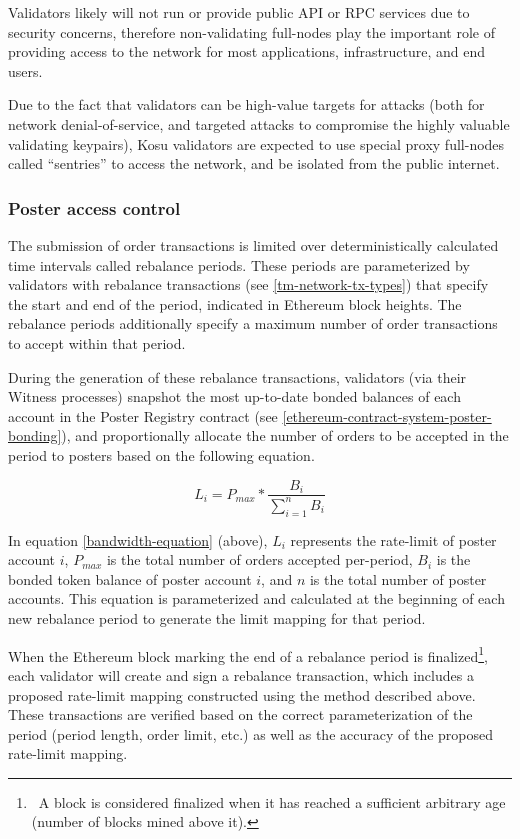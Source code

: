 \documentclass[10pt]{article}
\begin{document}
Validators likely will not run or provide public API or RPC services due to security concerns, therefore non-validating full-nodes play the important role of providing access to the network for most applications, infrastructure, and end users.
\medskip

Due to the fact that validators can be high-value targets for attacks (both for network denial-of-service, and targeted attacks to compromise the highly valuable validating keypairs), Kosu validators are expected to use special proxy full-nodes called ``sentries'' to access the network, and be isolated from the public internet\cite{sentry-architecture}.
\subsubsection{Poster access control}\label{tm-network-access}
The submission of order transactions is limited over deterministically calculated time intervals called rebalance periods. These periods are parameterized by validators with rebalance transactions (see \ref{tm-network-tx-types}) that specify the start and end of the period, indicated in Ethereum block heights. The rebalance periods additionally specify a maximum number of order transactions to accept within that period. 
\medskip

During the generation of these rebalance transactions, validators (via their Witness processes) snapshot the most up-to-date bonded balances of each account in the Poster Registry contract (see \ref{ethereum-contract-system-poster-bonding}), and proportionally allocate the number of orders to be accepted in the period to posters based on the following equation.

\begin{equation}\label{bandwidth-equation}
  L_i =  P_{max} * \frac{B_i}{\sum_{i=1}^{n}B_i}
\end{equation}
\medskip

In equation \ref{bandwidth-equation} (above), $L_i$ represents the rate-limit of poster account $i$, $P_{max}$ is the total number of orders accepted per-period, $B_i$ is the bonded token balance of poster account $i$, and $n$ is the total number of poster accounts. This equation is parameterized and calculated at the beginning of each new rebalance period to generate the limit mapping for that period.
\medskip 

When the Ethereum block marking the end of a rebalance period is finalized\footnote{\ A block is considered finalized when it has reached a sufficient arbitrary age (number of blocks mined above it).}, each validator will create and sign a rebalance transaction, which includes a proposed rate-limit mapping constructed using the method described above. These transactions are verified based on the correct parameterization of the period (period length, order limit, etc.) as well as the accuracy of the proposed rate-limit mapping. 
\medskip
\end{document}
